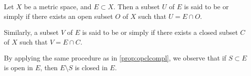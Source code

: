 \begin{definition}
    \label{def:reltop}
    Let \(X\) be a metric space,
    and \(E\subset X\).
    Then a subset \(U\) of \(E\) is said to be
    or simply 
    if there exists an open subset \(O\) of \(X\) such that
    \(U=E\cap O\).

    Similarly, a subset \(V\) of \(E\) is said to be
    or simply 
    if there exists a closed subset \(C\) of \(X\) such that
    \(V=E\cap C\).
\end{definition}

By applying the same procedure as in \cref{prop:opclcompl},
we observe that
if \(S\subset E\) is open in \(E\),
then \(E\setminus S\) is closed in \(E\).